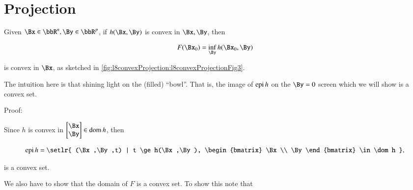 %
%

\section{Projection}

Given \( \Bx \in \bbR^n, \By \in \bbR^p \), if \( h(\Bx,\By) \) is convex in \( \Bx, \By \), then

\begin{equation}\label{eqn:convexOptimizationLecture8:60}
F(\Bx_0) = \inf_\By h(\Bx_0,\By)
\end{equation}

is convex in \( \Bx\), as sketched in \cref{fig:l8convexProjection:l8convexProjectionFig3}.


The intuition here is that shining light on the (filled) ``bowl''.  That is, the image of \( \operatorname{epi} h \) on the \( \By = 0 \) screen which we will show is a convex set.

Proof:

Since \( h \) is convex in \( \begin{bmatrix} \Bx \\ \By \end{bmatrix} \in \dom h \), then

\begin{equation}\label{eqn:convexOptimizationLecture8:80}
\epi h = \setlr{ (\Bx,\By,t) | t \ge h(\Bx,\By), \begin{bmatrix} \Bx \\ \By \end{bmatrix} \in \dom h },
\end{equation}

is a convex set.

We also have to show that the domain of \( F \) is a convex set.  To show this note that

